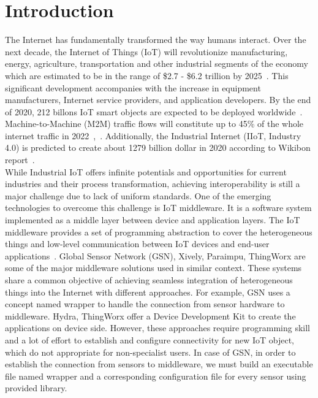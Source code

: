 \section{Introduction}
The Internet has fundamentally transformed the way humans interact. Over the next decade, the Internet of Things (IoT) will revolutionize manufacturing, energy, agriculture, transportation and other industrial segments of the economy which are estimated to be in the range of \$2.7 - \$6.2 trillion by 2025~\cite{manyika2013disruptive}. This significant development accompanies with the increase in equipment manufacturers, Internet service providers, and application developers. By the end of 2020, 212 billons IoT smart objects are expected to be deployed worldwide~\cite{gantz2012digital}. Machine-to-Machine (M2M) traffic flows will constitute up to 45\% of the whole internet traffic in 2022~\cite{taylor2013next},~\cite{evans2011internet}. Additionally, the Industrial Internet (IIoT, Industry 4.0) is predicted to create about 1279 billion dollar in 2020 according to Wikibon report~\cite{floyer2013defining}.\\

While Industrial IoT offers infinite potentials and opportunities for current industries and their process transformation, achieving interoperability is still a major challenge due to lack of uniform standards. One of the emerging technologies to overcome this challenge is IoT middleware. It is a software system implemented as a middle layer between device and application layers. The IoT middleware provides a set of programming abstraction to cover the heterogeneous things and low-level communication between IoT devices and end-user applications~\cite{fersi2015middleware}. Global Sensor Network (GSN), Xively, Paraimpu, ThingWorx are some of the major middleware solutions used in similar context. These systems share a common objective of achieving seamless integration of heterogeneous things into the Internet with different approaches. For example, GSN uses a concept named wrapper to handle the connection from sensor hardware to middleware. Hydra, ThingWorx offer a Device Development Kit to create the applications on device side. However, these approaches require programming skill and a lot of effort to establish and configure connectivity for new IoT object, which do not appropriate for non-specialist users. In case of GSN, in order to establish the connection from sensors to middleware, we must build an executable file named wrapper and a corresponding configuration file for every sensor using provided library. \\

